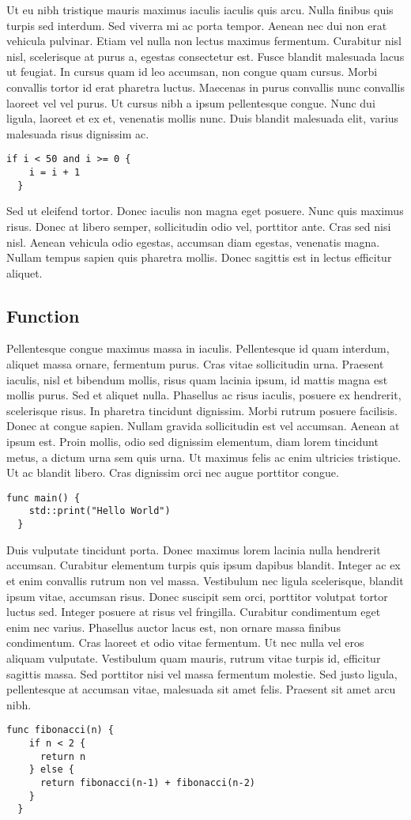 Ut eu nibh tristique mauris maximus iaculis iaculis quis arcu. Nulla finibus quis turpis sed interdum. Sed viverra mi ac porta tempor. Aenean nec dui non erat vehicula pulvinar. Etiam vel nulla non lectus maximus fermentum. Curabitur nisl nisl, scelerisque at purus a, egestas consectetur est. Fusce blandit malesuada lacus ut feugiat. In cursus quam id leo accumsan, non congue quam cursus. Morbi convallis tortor id erat pharetra luctus. Maecenas in purus convallis nunc convallis laoreet vel vel purus. Ut cursus nibh a ipsum pellentesque congue. Nunc dui ligula, laoreet et ex et, venenatis mollis nunc. Duis blandit malesuada elit, varius malesuada risus dignissim ac.
\begin{lstlisting}[language=Lucy]
  if i < 50 and i >= 0 {
    i = i + 1
  }
\end{lstlisting}
Sed ut eleifend tortor. Donec iaculis non magna eget posuere. Nunc quis maximus risus. Donec at libero semper, sollicitudin odio vel, porttitor ante. Cras sed nisi nisl. Aenean vehicula odio egestas, accumsan diam egestas, venenatis magna. Nullam tempus sapien quis pharetra mollis. Donec sagittis est in lectus efficitur aliquet.

\subsection{Function}
Pellentesque congue maximus massa in iaculis. Pellentesque id quam interdum, aliquet massa ornare, fermentum purus. Cras vitae sollicitudin urna. Praesent iaculis, nisl et bibendum mollis, risus quam lacinia ipsum, id mattis magna est mollis purus. Sed et aliquet nulla. Phasellus ac risus iaculis, posuere ex hendrerit, scelerisque risus. In pharetra tincidunt dignissim. Morbi rutrum posuere facilisis. Donec at congue sapien. Nullam gravida sollicitudin est vel accumsan. Aenean at ipsum est. Proin mollis, odio sed dignissim elementum, diam lorem tincidunt metus, a dictum urna sem quis urna. Ut maximus felis ac enim ultricies tristique. Ut ac blandit libero. Cras dignissim orci nec augue porttitor congue.
\begin{lstlisting}[language=Lucy]
  func main() {
    std::print("Hello World")
  }
\end{lstlisting}
Duis vulputate tincidunt porta. Donec maximus lorem lacinia nulla hendrerit accumsan. Curabitur elementum turpis quis ipsum dapibus blandit. Integer ac ex et enim convallis rutrum non vel massa. Vestibulum nec ligula scelerisque, blandit ipsum vitae, accumsan risus. Donec suscipit sem orci, porttitor volutpat tortor luctus sed. Integer posuere at risus vel fringilla. Curabitur condimentum eget enim nec varius. Phasellus auctor lacus est, non ornare massa finibus condimentum. Cras laoreet et odio vitae fermentum. Ut nec nulla vel eros aliquam vulputate. Vestibulum quam mauris, rutrum vitae turpis id, efficitur sagittis massa. Sed porttitor nisi vel massa fermentum molestie. Sed justo ligula, pellentesque at accumsan vitae, malesuada sit amet felis. Praesent sit amet arcu nibh.
\begin{lstlisting}[language=Lucy]
  func fibonacci(n) {
    if n < 2 {
      return n
    } else {
      return fibonacci(n-1) + fibonacci(n-2)
    }
  }
\end{lstlisting}

